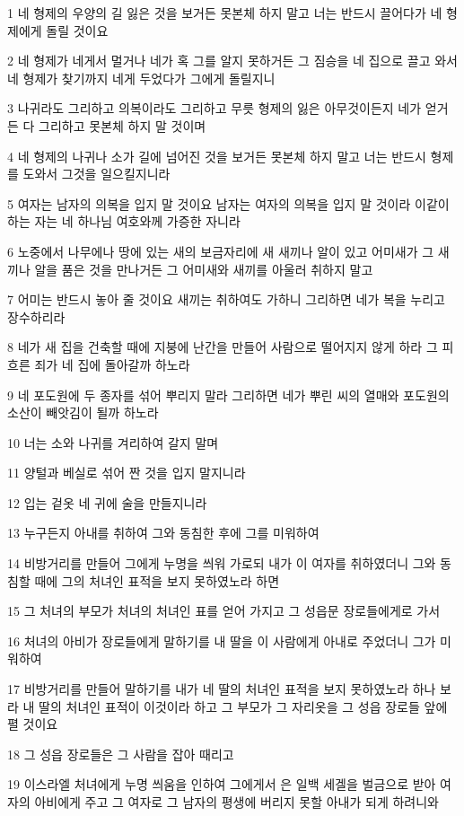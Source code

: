 \par 1 네 형제의 우양의 길 잃은 것을 보거든 못본체 하지 말고 너는 반드시 끌어다가 네 형제에게 돌릴 것이요
\par 2 네 형제가 네게서 멀거나 네가 혹 그를 알지 못하거든 그 짐승을 네 집으로 끌고 와서 네 형제가 찾기까지 네게 두었다가 그에게 돌릴지니
\par 3 나귀라도 그리하고 의복이라도 그리하고 무릇 형제의 잃은 아무것이든지 네가 얻거든 다 그리하고 못본체 하지 말 것이며
\par 4 네 형제의 나귀나 소가 길에 넘어진 것을 보거든 못본체 하지 말고 너는 반드시 형제를 도와서 그것을 일으킬지니라
\par 5 여자는 남자의 의복을 입지 말 것이요 남자는 여자의 의복을 입지 말 것이라 이같이 하는 자는 네 하나님 여호와께 가증한 자니라
\par 6 노중에서 나무에나 땅에 있는 새의 보금자리에 새 새끼나 알이 있고 어미새가 그 새끼나 알을 품은 것을 만나거든 그 어미새와 새끼를 아울러 취하지 말고
\par 7 어미는 반드시 놓아 줄 것이요 새끼는 취하여도 가하니 그리하면 네가 복을 누리고 장수하리라
\par 8 네가 새 집을 건축할 때에 지붕에 난간을 만들어 사람으로 떨어지지 않게 하라 그 피 흐른 죄가 네 집에 돌아갈까 하노라
\par 9 네 포도원에 두 종자를 섞어 뿌리지 말라 그리하면 네가 뿌린 씨의 열매와 포도원의 소산이 빼앗김이 될까 하노라
\par 10 너는 소와 나귀를 겨리하여 갈지 말며
\par 11 양털과 베실로 섞어 짠 것을 입지 말지니라
\par 12 입는 겉옷 네 귀에 술을 만들지니라
\par 13 누구든지 아내를 취하여 그와 동침한 후에 그를 미워하여
\par 14 비방거리를 만들어 그에게 누명을 씌워 가로되 내가 이 여자를 취하였더니 그와 동침할 때에 그의 처녀인 표적을 보지 못하였노라 하면
\par 15 그 처녀의 부모가 처녀의 처녀인 표를 얻어 가지고 그 성읍문 장로들에게로 가서
\par 16 처녀의 아비가 장로들에게 말하기를 내 딸을 이 사람에게 아내로 주었더니 그가 미워하여
\par 17 비방거리를 만들어 말하기를 내가 네 딸의 처녀인 표적을 보지 못하였노라 하나 보라 내 딸의 처녀인 표적이 이것이라 하고 그 부모가 그 자리옷을 그 성읍 장로들 앞에 펼 것이요
\par 18 그 성읍 장로들은 그 사람을 잡아 때리고
\par 19 이스라엘 처녀에게 누명 씌움을 인하여 그에게서 은 일백 세겔을 벌금으로 받아 여자의 아비에게 주고 그 여자로 그 남자의 평생에 버리지 못할 아내가 되게 하려니와

